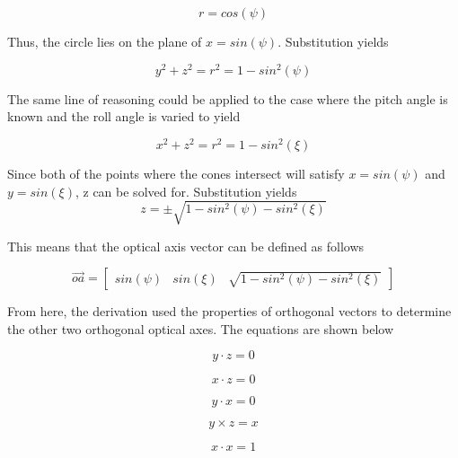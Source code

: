 \documentclass[12pt,a4paper]{book}
\begin{document}
\begin{equation}
r = cos(\psi)
\end{equation}

Thus, the circle lies on the plane of $x = sin(\psi)$.  Substitution yields

\begin{equation}
y^{2} + z^{2} = r^{2} = 1 - sin^{2}(\psi)
\end{equation}

The same line of reasoning could be applied to the case where the pitch angle is known and the roll angle is varied to yield

\begin{equation}
x^{2} + z^{2} = r^{2} = 1 - sin^{2}(\xi)
\end{equation}

Since both of the points where the cones intersect will satisfy $x = sin(\psi)$ and $y = sin(\xi)$, z can be solved for.  Substitution yields
\begin{equation}
z = \pm \sqrt{1 - sin^{2}(\psi) - sin^{2}(\xi)}
\end{equation}

This means that the optical axis vector can be defined as follows

\begin{equation}
\vec{oa} = \begin{bmatrix} sin(\psi) & sin(\xi) & \sqrt{1 - sin^{2}(\psi) - sin^{2}(\xi)}  \end{bmatrix}
\label{e:oavector}
\end{equation}

From here, the derivation used the properties of orthogonal vectors to determine the other two orthogonal optical axes.  The equations are shown below

\begin{equation}
y \cdot z = 0
\end{equation}

\begin{equation}
x \cdot z = 0
\end{equation}

\begin{equation}
y \cdot x = 0
\end{equation}

\begin{equation}
y \times z = x
\end{equation}

\begin{equation}
x \cdot x = 1
\end{equation}
\end{document}
